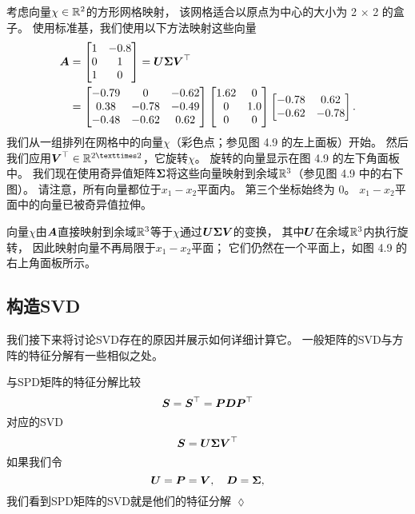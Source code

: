 \begin{example}[向量与SVD]
考虑向量$\chi \in \mathbb{R}^2$的方形网格映射，
该网格适合以原点为中心的大小为 2 × 2 的盒子。
使用标准基，我们使用以下方法映射这些向量
\begin{subequations}
    \begin{align}
        \boldsymbol{A} &=
        \begin{bmatrix}
            1 & -0.8 \\
            0 & 1 \\
            1 & 0
        \end{bmatrix}
        = \boldsymbol{U}\boldsymbol{\Sigma}\boldsymbol{V}^\top \\
        &=
        \begin{bmatrix}
            -0.79 & 0 & -0.62 \\
            0.38 & -0.78 & -0.49 \\
            -0.48 & -0.62 & 0.62
        \end{bmatrix}
        \begin{bmatrix}
            1.62 & 0 \\
            0 & 1.0 \\
            0 & 0
        \end{bmatrix}
        \begin{bmatrix}
            -0.78 & 0.62 \\
            -0.62 & -0.78
        \end{bmatrix}.
    \end{align}
\end{subequations}
我们从一组排列在网格中的向量$\chi$（彩色点；参见图 4.9 的左上面板）开始。
然后我们应用$\V^\top \in \R^{2×2}$，它旋转$\chi$。
旋转的向量显示在图 4.9 的左下角面板中。
我们现在使用奇异值矩阵$\boldsymbol{\Sigma}$将这些向量映射到余域$\mathbb{R}^3$（参见图 4.9 中的右下图）。
请注意，所有向量都位于$x_1 - x_2$平面内。
第三个坐标始终为 0。
$x_1-x_2$平面中的向量已被奇异值拉伸。

向量$\chi$由$\boldsymbol{A}$直接映射到余域$\mathbb{R}^3$等于$\chi$通过$\boldsymbol{U}\boldsymbol{\Sigma}\boldsymbol{V}$的变换，
其中$\boldsymbol{U}$在余域$\mathbb{R}^3$内执行旋转，
因此映射向量不再局限于$x_1 -x_2$平面；
它们仍然在一个平面上，如图 4.9 的右上角面板所示。
\end{example}

\subsection{构造SVD}
我们接下来将讨论SVD存在的原因并展示如何详细计算它。
一般矩阵的SVD与方阵的特征分解有一些相似之处。
\begin{remark}
与SPD矩阵的特征分解比较
\begin{equation}
    \boldsymbol{S} = \boldsymbol{S}^\top = \boldsymbol{P}\boldsymbol{D}\boldsymbol{P}^\top
\end{equation}
对应的SVD
\begin{equation}
    \boldsymbol{S} = \boldsymbol{U}\boldsymbol{\Sigma}\boldsymbol{V}^\top
\end{equation}
如果我们令
\begin{equation}
    \boldsymbol{U} = \boldsymbol{P} = \boldsymbol{V},\quad \boldsymbol{D} = \boldsymbol{\Sigma},
\end{equation}
我们看到SPD矩阵的SVD就是他们的特征分解
\hfill$\lozenge$
\end{remark}

